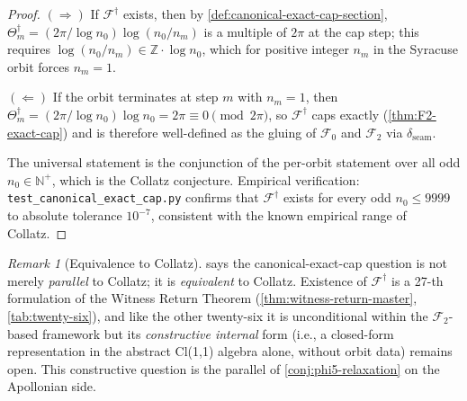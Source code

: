 \documentclass[11pt,a4paper]{article}
\theoremstyle{plain}
\theoremstyle{definition}
\theoremstyle{remark}
\newtheorem{remark}[theorem]{Remark}
\numberwithin{equation}{section}
\newcommand{\Nat}{\mathbb{N}}
\newcommand{\Z}{\mathbb{Z}}
\begin{document}
\begin{proof}
$(\Rightarrow)$ If $\mathcal{F}^{\dagger}$ exists, then by
\cref{def:canonical-exact-cap-section},
$\Theta_m^{\dagger}=(2\pi/\log n_0)\log(n_0/n_m)$ is a multiple of
$2\pi$ at the cap step; this requires $\log(n_0/n_m)\in\Z\cdot\log
n_0$, which for positive integer $n_m$ in the Syracuse orbit forces
$n_m=1$.

$(\Leftarrow)$ If the orbit terminates at step $m$ with $n_m=1$, then
$\Theta_m^{\dagger}=(2\pi/\log n_0)\log n_0=2\pi\equiv 0\pmod{2\pi}$,
so $\mathcal{F}^{\dagger}$ caps exactly (\cref{thm:F2-exact-cap}) and
is therefore well-defined as the gluing of $\mathcal{F}_0$ and
$\mathcal{F}_2$ via $\delta_{\mathrm{seam}}$.

The universal statement is the conjunction of the per-orbit
statement over all odd $n_0\in\Nat^+$, which is the Collatz
conjecture.  Empirical verification:
\texttt{test\_canonical\_exact\_cap.py} confirms that
$\mathcal{F}^{\dagger}$ exists for every odd $n_0\le 9999$ to
absolute tolerance $10^{-7}$, consistent with the known empirical
range of Collatz.
\end{proof}

\begin{remark}[Equivalence to Collatz]
\label{rmk:fdagger-equivalent-to-collatz}
 says the canonical-exact-cap question
is not merely \emph{parallel} to Collatz; it is \emph{equivalent} to
Collatz.  Existence of $\mathcal{F}^{\dagger}$ is a 27-th
formulation of the Witness Return Theorem
(\cref{thm:witness-return-master}, \cref{tab:twenty-six}), and like
the other twenty-six it is unconditional within the
$\mathcal{F}_2$-based framework but its \emph{constructive
internal} form (i.e., a closed-form representation in the abstract
Cl(1,1) algebra alone, without orbit data) remains open.  This
constructive question is the parallel of
\cref{conj:phi5-relaxation} on the Apollonian side.
\end{remark}
\end{document}
